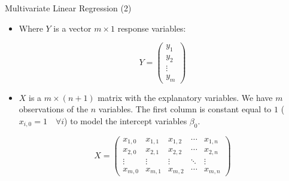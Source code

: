 \documentclass[handout]{beamer}
\begin{document}
\begin{frame}{Multivariate Linear Regression (2)}
\scriptsize{
\begin{itemize} 
\item Where $Y$ is a vector $m\times 1$ response variables:

\begin{displaymath}
 Y =
 \begin{pmatrix}
  y_{1} \\
  y_{2}  \\
  \vdots  \\
  y_{m}
 \end{pmatrix}
\end{displaymath}

\item $X$ is a $m \times (n+1)$  matrix with the explanatory variables. We have $m$ observations of the $n$ variables.  The first column is constant equal to $1$ ($x_{i,0}=1 \quad \forall i$) to model the intercept variables $\beta_0$.

\begin{displaymath}
 X =
 \begin{pmatrix}
x_{1,0} &  x_{1,1} & x_{1,2} & \cdots & x_{1,n} \\
x_{2,0} &  x_{2,1} & x_{2,2} & \cdots & x_{2,n} \\
\vdots  &  \vdots  & \vdots  & \ddots & \vdots  \\
x_{m,0} &  x_{m,1} & x_{m,2} & \cdots & x_{m,n}
 \end{pmatrix}
\end{displaymath}






\end{itemize}
 

}
\end{frame}
\end{document}

